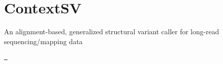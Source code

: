 \chapter{Context\+SV}
\hypertarget{md__r_e_a_d_m_e}{}\label{md__r_e_a_d_m_e}
\label{md__r_e_a_d_m_e_autotoc_md6}%
%
An alignment-\/based, generalized structural variant caller for long-\/read sequencing/mapping data

\href{https://github.com/WGLab/ContextSV/actions/workflows/build-tests.yml}{\texttt{ }} 